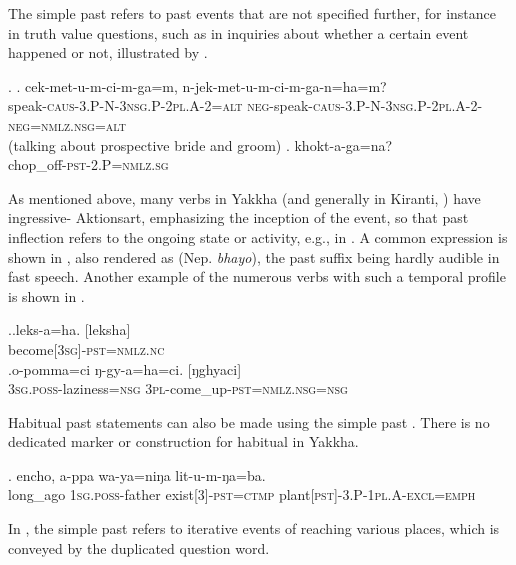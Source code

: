 The simple past  refers to past events that are not specified further, for instance in truth value questions, such as  in inquiries about whether a certain event happened or not, illustrated by \Next. 

\ex. \ag.  cek-met-u-m-ci-m-ga=m, n-jek-met-u-m-ci-m-ga-n=ha=m?\\
speak{\scshape -caus-3.P-N-3nsg.P-2pl.A-2=alt} {\scshape neg-}speak{\scshape -caus-3.P-N-3nsg.P-2pl.A-2-neg=nmlz.nsg=alt}\\
 (talking about prospective bride and groom) 
\bg. khokt-a-ga=na?\\
chop\_off{\scshape -pst-2.P=nmlz.sg}\\
 


As mentioned above, many verbs in Yakkha (and generally in Kiranti, \citealt[512]{Ebert2003Kiranti}) have ingressive- Aktionsart, emphasizing the inception of the event, so that past inflection refers to the ongoing state or activity, e.g., in \Last[b]. A common expression is shown in \Next[a], also rendered as  (Nep. \emph{bhayo}), the past suffix being hardly audible in fast speech. Another example of the numerous verbs with such a temporal profile is shown in \Next[b].

\ex.\ag.leks-a=ha. [leksha]\\
become{\scshape [3sg]-pst=nmlz.nc}\\
\bg.o-pomma=ci ŋ-gy-a=ha=ci. \hspace*{-.45cm}[ŋghyaci]\\
{\scshape 3sg.poss-}laziness{\scshape =nsg} {\scshape 3pl-}come\_up{\scshape -pst=nmlz.nsg=nsg}\\

Habitual past statements can also be made using the simple past \Next. There is no dedicated marker or construction for habitual  in Yakkha.

\exg. encho,        a-ppa             wa-ya=niŋa               lit-u-m-ŋa=ba.\\
long\_ago {\scshape 1sg.poss-}father exist{\scshape [3]-pst=ctmp} plant{\scshape [pst]-3.P-1pl.A-excl=emph}\\
 

In \Next, the simple past refers to iterative events of reaching various places, which is conveyed by the duplicated question word.

